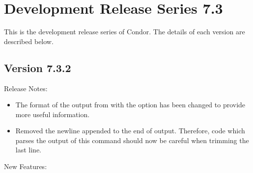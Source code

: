 
\section{\label{sec:History-7-3}Development Release Series 7.3}

This is the development release series of Condor.
The details of each version are described below.

\subsection*{\label{sec:New-7-3-2}Version 7.3.2}

\noindent Release Notes:

\begin{itemize}

\item The format of the output from  with the  option
has been changed to provide more useful information.

\item Removed the newline appended to the end of 
 output.
Therefore, code which parses the output of this command should now
be careful when trimming the last line.

\end{itemize}

\noindent New Features:

